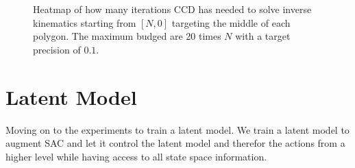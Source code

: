 \begin{figure}
    \begin{center}
        \hfill
        \hfill
    \end{center}
    \caption[CCD iteration heatmap]{Heatmap of how many iterations CCD has needed to solve inverse kinematics starting from $[N, 0]$ targeting the middle of each polygon. The maximum budged are 20 times $N$ with a target precision of $0.1$.}
    \label{fig:SAC_baseline_min_distance_step}
\end{figure}



\section{Latent Model}

Moving on to the experiments to train a latent model. We train a latent model to augment SAC and let it control the latent model and therefor the actions from a higher level while having access to all state space information.

